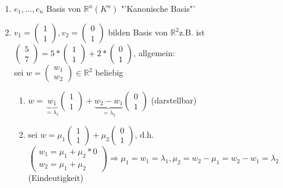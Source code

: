 \documentclass[a4paper,11pt]{article}
\begin{document}
\begin{enumerate}[label=\alph*)]
\item $e_1,...,e_n$ Basis von $\mathbb{R}^n(K^n)$ "'Kanonische Basis"'
\item $v_1=\begin{pmatrix}1\\1\end{pmatrix}, v_2=\begin{pmatrix}0\\1\end{pmatrix}$ bilden Basis von $\mathbb{R}^2$\hspace{5mm}z.B. ist $\begin{pmatrix}5\\7\end{pmatrix}=5*\begin{pmatrix}1\\1\end{pmatrix}+2*\begin{pmatrix}0\\1\end{pmatrix}$, allgemein: \\
sei $w=\begin{pmatrix}w_1\\w_2\end{pmatrix}\in\mathbb{R}^2$ beliebig
\begin{enumerate}[label=(\arabic*)]
\item $w=\underbrace{w_1}_{=\lambda_1}\begin{pmatrix}1\\1\end{pmatrix}+\underbrace{w_2-w_1}_{=\lambda_2}\begin{pmatrix}0\\1\end{pmatrix}$ (darstellbar)
\item sei $w=\mu_1\begin{pmatrix}1\\1\end{pmatrix}+\mu_2\begin{pmatrix}0\\1\end{pmatrix}$, d.h. $\begin{pmatrix}w_1=\mu_1+\mu_2*0\\w_2=\mu_1+\mu_2\end{pmatrix}\Rightarrow\mu_1=w_1=\lambda_1,\mu_2=w_2-\mu_1=w_2-w_1=\lambda_2$ (Eindeutigkeit)
\end{enumerate}
\end{enumerate}
\end{document}
